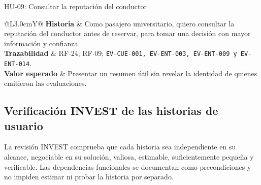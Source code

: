 \documentclass[12pt,a4paper]{article}
\newcommand{\CampoHU}[2]{\textbf{#1} & #2\\}
\begin{document}
\begin{HUBox}{HU-09: Consultar la reputación del conductor}
\small
\begin{tabularx}{\linewidth}{@{}L{3.0cm}Y@{}}
\CampoHU{Historia}{Como pasajero universitario, quiero consultar la reputación del conductor antes de reservar, para tomar una decisión con mayor información y confianza.}
\CampoHU{Trazabilidad}{RF-24; RF-09; \texttt{EV-CUE-001, EV-ENT-003, EV-ENT-009 y EV-ENT-014}.}
\CampoHU{Valor esperado}{Presentar un resumen útil sin revelar la identidad de quienes emitieron las evaluaciones.}
\end{tabularx}
\end{HUBox}

\subsection{Verificación INVEST de las historias de usuario}

La revisión INVEST comprueba que cada historia sea independiente en su alcance, negociable en su solución, valiosa, estimable, suficientemente pequeña y verificable. Las dependencias funcionales se documentan como precondiciones y no impiden estimar ni probar la historia por separado.
\end{document}
